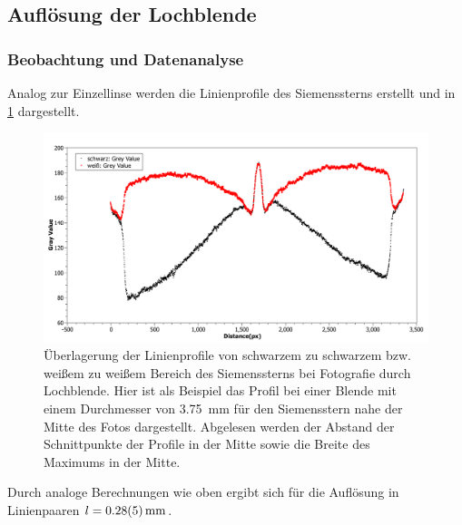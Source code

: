 \documentclass[
	a4paper,
	12pt,
	pagesize,
	ngerman
]{scrartcl}
\begin{document}
	
	\subsection{Auflösung der Lochblende}
	\subsubsection{Beobachtung und Datenanalyse}
	Analog zur Einzellinse werden die Linienprofile des Siemenssterns erstellt und in \cref{fig_lochblende_profil} dargestellt.
	
	\begin{figure}[H]  
		\includegraphics[width=1\textwidth]{fig_lochblende}
		\centering
		\caption{
		Überlagerung der Linienprofile von schwarzem zu schwarzem bzw. weißem zu weißem Bereich des Siemenssterns bei Fotografie durch Lochblende.
		Hier ist als Beispiel das Profil bei einer Blende mit einem Durchmesser von \SI{3,75}{mm} für den Siemensstern nahe der Mitte des Fotos dargestellt.
		Abgelesen werden der Abstand der Schnittpunkte der Profile in der Mitte sowie die Breite des Maximums in der Mitte.
		}
		\label{fig_lochblende_profil}
		\centering
	\end{figure}
	
	Durch analoge Berechnungen wie oben ergibt sich für die Auflösung in Linienpaaren $l = \SI{0.28\pm 0.05}{mm}$.
	
\end{document}
